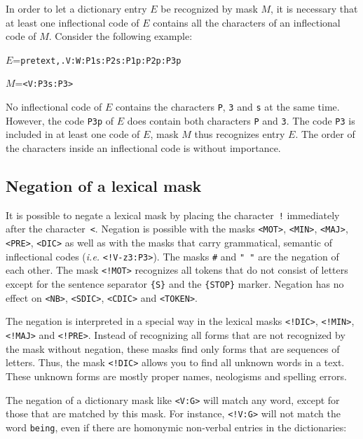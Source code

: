 \bigskip
\noindent In order to let a dictionary entry $E$ be recognized by mask $M$, it
is necessary that at least one inflectional code of $E$ contains all the characters
of an inflectional code of $M$. Consider the following example:

\bigskip
$E$=\verb$pretext,.V:W:P1s:P2s:P1p:P2p:P3p$

$M$=\verb$<V:P3s:P3>$

\bigskip
\noindent No inflectional code of $E$ contains the characters \verb+P+,
\verb+3+ and \verb+s+ at the same time. However, the code \verb+P3p+ of $E$
does contain both characters \verb+P+ and \verb+3+. The code \verb+P3+ is
included in at least one code of $E$, mask $M$ thus recognizes entry $E$. The order of the
characters inside an inflectional code is without importance.

\subsection{Negation of a lexical mask}
It is possible to negate a lexical mask by placing the character~\verb+!+ immediately
after the character~\verb+<+.
Negation is possible with the masks \verb+<MOT>+, \verb+<MIN>+, \verb+<MAJ>+,
\verb+<PRE>+, \verb+<DIC>+ as well as with the masks that carry grammatical,
semantic of inflectional codes (\textit{i.e.} \verb$<!V-z3:P3>$).
The masks \verb+#+ and \verb+" "+ are the negation of each other.
\index{\verb+#+} The
mask \verb$<!MOT>$ recognizes all tokens that do not consist of
letters except for the sentence separator \verb+{S}+ and the \verb+{STOP}+ marker.
Negation has no effect on \verb+<NB>+, \verb+<SDIC>+, \verb+<CDIC>+ and \verb+<TOKEN>+.

\bigskip
\noindent The negation is interpreted in a special way in the lexical masks
\verb+<!DIC>+, \verb+<!MIN>+, \verb+<!MAJ>+ and \verb+<!PRE>+.
Instead of recognizing all forms that are not recognized by the mask without
negation, these masks find only forms that are sequences of letters.
Thus, the mask \verb+<!DIC>+ allows you to find all unknown words in a text.
These unknown forms are mostly proper names, neologisms and spelling errors.

\bigskip
\noindent The negation of a dictionary mask like \verb+<V:G>+ will match any
word, except for those that are matched by this mask. For instance, \verb+<!V:G>+ will not
match the word \verb+being+, even if there are homonymic non-verbal entries in
the dictionaries:


